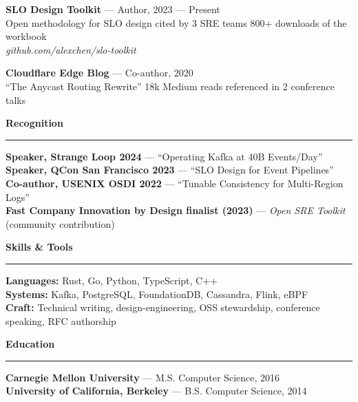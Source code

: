 \documentclass[letterpaper,10pt]{article}
\newcommand{\mainhead}[1]{%
  \vspace{16pt}
  {\bfseries\fontsize{14}{18}\selectfont\textcolor{boldAccent}{#1}}
  \vspace{4pt}
  \noindent\textcolor{boldAccent}{\rule{\linewidth}{0.5pt}}
  \vspace{4pt}
}
\begin{document}
\vspace{6pt}
\noindent\textbf{SLO Design Toolkit} --- Author, 2023 --- Present \\
\textcolor{boldSec}{Open methodology for SLO design \textperiodcentered{} cited by 3 SRE teams \textperiodcentered{} 800+ downloads of the workbook} \\
\textit{github.com/alexchen/slo-toolkit}

\vspace{6pt}
\noindent\textbf{Cloudflare Edge Blog} --- Co-author, 2020 \\
\textcolor{boldSec}{``The Anycast Routing Rewrite'' \textperiodcentered{} 18k Medium reads \textperiodcentered{} referenced in 2 conference talks}

\mainhead{Recognition}

\noindent\textbf{Speaker, Strange Loop 2024} --- ``Operating Kafka at 40B Events/Day'' \\
\noindent\textbf{Speaker, QCon San Francisco 2023} --- ``SLO Design for Event Pipelines'' \\
\noindent\textbf{Co-author, USENIX OSDI 2022} --- ``Tunable Consistency for Multi-Region Logs'' \\
\noindent\textbf{Fast Company Innovation by Design finalist (2023)} --- \textit{Open SRE Toolkit} (community contribution)

\mainhead{Skills \& Tools}

\noindent\textbf{Languages:} Rust, Go, Python, TypeScript, C++ \\
\textbf{Systems:} Kafka, PostgreSQL, FoundationDB, Cassandra, Flink, eBPF \\
\textbf{Craft:} Technical writing, design-engineering, OSS stewardship, conference speaking, RFC authorship

\mainhead{Education}

\noindent\textbf{Carnegie Mellon University} --- M.S. Computer Science, 2016 \\
\textbf{University of California, Berkeley} --- B.S. Computer Science, 2014
\end{document}
